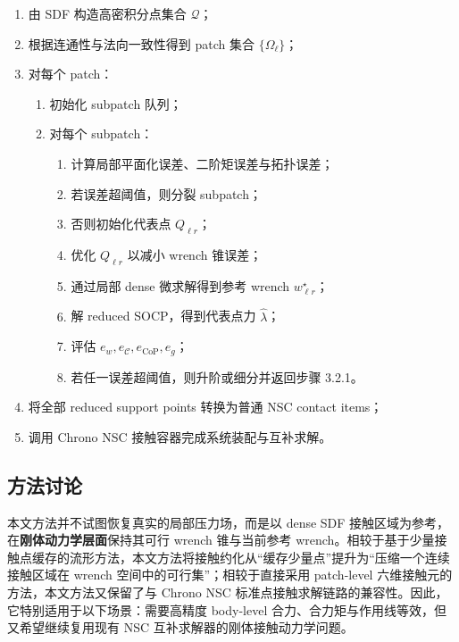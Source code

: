 \documentclass[UTF8,a4paper,11pt]{ctexart}
\begin{document}
\begin{enumerate}[label=\arabic*.]
    \item 由 SDF 构造高密积分点集合 $\mathcal{Q}$；
    \item 根据连通性与法向一致性得到 patch 集合 $\{\Omega_\ell\}$；
    \item 对每个 patch：
    \begin{enumerate}[label*=\arabic*.]
        \item 初始化 subpatch 队列；
        \item 对每个 subpatch：
        \begin{enumerate}[label*=\arabic*.]
            \item 计算局部平面化误差、二阶矩误差与拓扑误差；
            \item 若误差超阈值，则分裂 subpatch；
            \item 否则初始化代表点 $Q_{\ell r}$；
            \item 优化 $Q_{\ell r}$ 以减小 wrench 锥误差；
            \item 通过局部 dense 微求解得到参考 wrench $w_{\ell r}^\star$；
            \item 解 reduced SOCP，得到代表点力 $\hat{\lambda}$；
            \item 评估 $e_w,e_{\mathcal{C}},e_{\mathrm{CoP}},e_g$；
            \item 若任一误差超阈值，则升阶或细分并返回步骤 3.2.1。
        \end{enumerate}
    \end{enumerate}
    \item 将全部 reduced support points 转换为普通 NSC contact items；
    \item 调用 Chrono NSC 接触容器完成系统装配与互补求解。
\end{enumerate}

\subsection{方法讨论}

本文方法并不试图恢复真实的局部压力场，而是以 dense SDF 接触区域为参考，在\textbf{刚体动力学层面}保持其可行 wrench 锥与当前参考 wrench。相较于基于少量接触点缓存的流形方法，本文方法将接触约化从“缓存少量点”提升为“压缩一个连续接触区域在 wrench 空间中的可行集”；相较于直接采用 patch-level 六维接触元的方法，本文方法又保留了与 Chrono NSC 标准点接触求解链路的兼容性。因此，它特别适用于以下场景：需要高精度 body-level 合力、合力矩与作用线等效，但又希望继续复用现有 NSC 互补求解器的刚体接触动力学问题。
\end{document}
